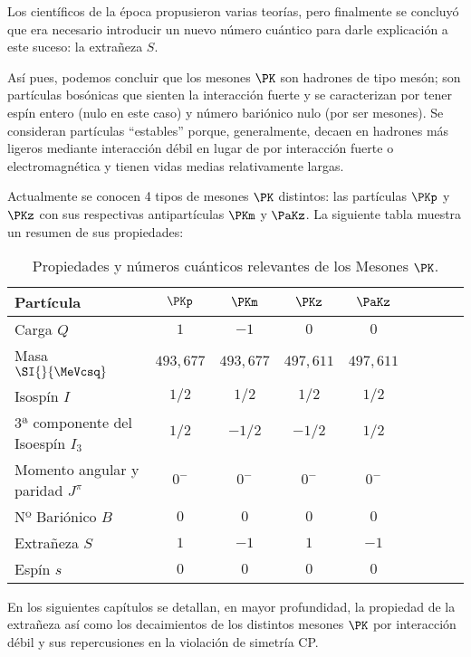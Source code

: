 Los científicos de la época propusieron varias teorías, pero finalmente se concluyó que era necesario introducir un nuevo número cuántico para darle explicación a este suceso: la extrañeza $S$. 

Así pues, podemos concluir que los mesones $\PK$ son hadrones de tipo mesón; son partículas bosónicas que sienten la interacción fuerte y se caracterizan por tener espín entero (nulo en este caso) y número bariónico nulo (por ser mesones). Se consideran partículas ``estables'' porque, generalmente, decaen en hadrones más ligeros mediante interacción débil en lugar de por interacción fuerte o electromagnética y tienen vidas medias relativamente largas.

Actualmente se conocen 4 tipos de mesones $\PK$ distintos: las partículas $\PKp$ y $\PKz$ con sus respectivas antipartículas $\PKm$ y $\PaKz$. La siguiente tabla muestra un resumen de sus propiedades:\\

\begin{table}[h]
	\centering
	\begin{tabular}{l*{7}{c}r}
\hline
Partícula & $\PKp$ & $\PKm$ & $\PKz$ & $\PaKz$ \\ 
\hline
Carga $Q$ & $1$ & $-1$ & $0$ & $0$\\
Masa $\SI{}{\MeVcsq}$ & $493,677$ & $493,677$ & $497,611$ & $497,611$\\
Isospín $I$ & $1/2$ & $1/2$ & $1/2$ & $1/2$ \\
3ª componente del Isoespín $I_3$ & $1/2$ & $-1/2$ & $-1/2$ & $1/2$ \\
Momento angular y paridad $J^\pi$ & $0^-$ & $0^-$ & $0^-$ & $0^-$ \\
Nº Bariónico $B$ & $0$ & $0$ & $0$ & $0$\\
Extrañeza $S$ & $1$ & $-1$ & $1$ & $-1$\\
Espín $s$ & $0$ & $0$ & $0$ & $0$\\ 
\hline
	\end{tabular}
\caption[Propiedades y números cuánticos relevantes de los Mesones $\PK$]{Propiedades y números cuánticos relevantes de los Mesones $\PK$.\protect\footnotemark}
\label{tab:propiedades}
\end{table}


En los siguientes capítulos se detallan, en mayor profundidad, la propiedad de la extrañeza así como los decaimientos de los distintos mesones $\PK$ por interacción débil y sus repercusiones en la violación de simetría CP.
